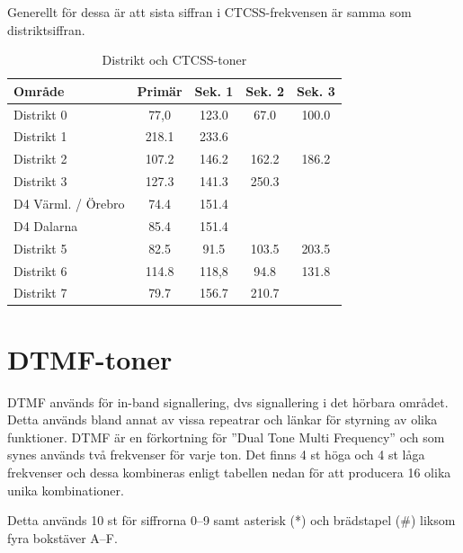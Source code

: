 Generellt för dessa är att sista siffran i CTCSS-frekvensen är samma som
distriktsiffran.

\begin{table}[H]
\centering
\begin{tabular}{lcccc}
	\textbf{Område}    & \textbf{Primär} & \textbf{Sek. 1} & \textbf{Sek. 2} & \textbf{Sek. 3} \\ \hline
	Distrikt 0         & 77,0            & 123.0           & 67.0            & 100.0           \\
	Distrikt 1         & 218.1           & 233.6           &                 &                 \\
	Distrikt 2         & 107.2           & 146.2           & 162.2           & 186.2           \\
	Distrikt 3         & 127.3           & 141.3           & 250.3           &                 \\
	D4 Värml. / Örebro & 74.4            & 151.4           &                 &                 \\
	D4 Dalarna         & 85.4            & 151.4           &                 &                 \\
	Distrikt 5         & 82.5            & 91.5            & 103.5           & 203.5           \\
	Distrikt 6         & 114.8           & 118,8           & 94.8            & 131.8           \\
	Distrikt 7         & 79.7            & 156.7           & 210.7           &
\end{tabular}
\caption{Distrikt och CTCSS-toner}
\end{table}

\section{DTMF-toner}

\label{DTMF}

DTMF används för in-band signallering, dvs signallering i det hörbara området.
Detta används bland annat av vissa repeatrar och länkar för styrning av olika
funktioner. DTMF är en förkortning för ''Dual Tone Multi Frequency'' och som
synes används två frekvenser för varje ton. Det finns 4 st höga och 4 st låga
frekvenser och dessa kombineras enligt tabellen nedan för att producera 16 olika
unika kombinationer.

Detta används 10 st för siffrorna 0--9 samt asterisk (*) och brädstapel (\#)
liksom fyra bokstäver A--F.

